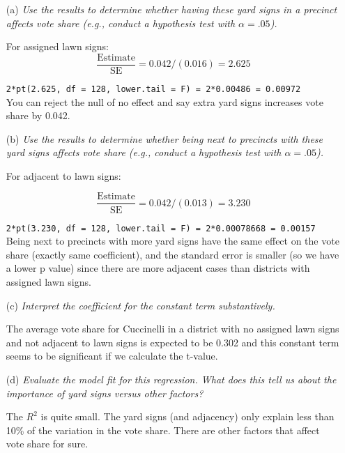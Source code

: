 \documentclass[12pt,letterpaper]{article}
\begin{document}
\begin{enumerate}
	\item [(a)] \textit{Use the results to determine whether having these yard signs in a precinct affects vote share (e.g., conduct a hypothesis test with $\alpha = .05$).}
	
	For assigned lawn signs:
	$$\frac{\text{Estimate}}{\text{SE}} =  0.042/(0.016) = 2.625$$
	
	\texttt{2*pt(2.625, df = 128, lower.tail = F) = 2*0.00486 = 0.00972}\\
	
	You can reject the null of no effect and say extra yard signs increases vote share by 0.042.
	
	\item [(b)]  \textit{Use the results to determine whether being
		next to precincts with these yard signs affects vote
		share (e.g., conduct a hypothesis test with $\alpha = .05$).}
	
	For adjacent to lawn signs:
	
	$$\frac{\text{Estimate}}{\text{SE}} =  0.042/(0.013) = 3.230$$
	
	\texttt{2*pt(3.230, df = 128, lower.tail = F) = 2*0.00078668 = 0.00157}\\
	
	Being next to precincts with more yard signs have the same effect on the vote share (exactly same coefficient), and the standard error is smaller (so we have a lower p value) since there are more adjacent cases than districts with assigned lawn signs.
	
	\item [(c)] \textit{Interpret the coefficient for the constant term substantively.}
	
	The average vote share for Cuccinelli in a district with no assigned lawn signs and not adjacent to lawn signs is expected to be 0.302 and this constant term seems to be significant if we calculate the t-value.
	
	\item [(d)] \textit{Evaluate the model fit for this regression.  What does this tell us about the importance of yard signs versus other factors?}
	
	The $R^2$ is quite small. The yard signs (and adjacency) only explain less than 10\% of the variation in the vote share. There are other factors that affect vote share for sure.
	
\end{enumerate}  
\end{document}
